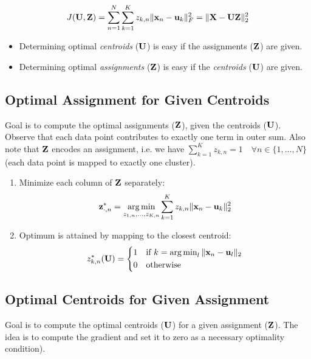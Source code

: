 \begin{lemma}
\[
J(\mathbf{U}, \mathbf{Z}) = \sum_{n=1}^N \sum_{k=1}^K z_{k, n} \| \mathbf{x}_n - \mathbf{u}_k \|_F^2 = \| \mathbf{X} - \mathbf{UZ} \|_2^2
\]
\end{lemma}

\begin{itemize}
\item Determining optimal \textit{centroids} (\(\mathbf{U}\)) is easy if the assignments (\(\mathbf{Z}\)) are given.
\item Determining optimal \textit{assignments} (\(\mathbf{Z}\)) is easy if the \textit{centroids} (\(\mathbf{U}\)) are given.
\end{itemize}

\subsection{Optimal Assignment for Given Centroids}
Goal is to compute the optimal assignments (\(\mathbf{Z}\)), given the centroids (\(\mathbf{U}\)). Observe that each data point contributes to exactly one term in outer sum. Also note that \(\mathbf{Z}\) encodes an assignment, i.e. we have \(\sum_{k=1}^K z_{k, n} = 1 \quad \forall n \in \{1, \ldots, N\}\) (each data point is mapped to exactly one cluster).

\begin{enumerate}
\item Minimize each column of \(\mathbf{Z}\) separately: \[
\mathbf{z}_{\cdot, n}^\ast = \operatorname*{arg\,min}_{z_{1, n}, \ldots, z_{K, n}} \sum_{k=1}^K z_{k, n} \| \mathbf{x}_n - \mathbf{u}_k \|_2^2
\]

\item Optimum is attained by mapping to the closest centroid: \[
z_{k, n}^\ast(\matr{U}) = \begin{dcases*}
1 & if \(k = \argmin_l \| \matr{x}_n - \matr{u}_l \|_2\)\\
0 & otherwise
\end{dcases*}
\]
\end{enumerate}

\subsection{Optimal Centroids for Given Assignment}
Goal is to compute the optimal centroids (\(\mathbf{U}\)) for a given assignment (\(\mathbf{Z}\)). The idea is to compute the gradient and set it to zero as a necessary optimality condition).

